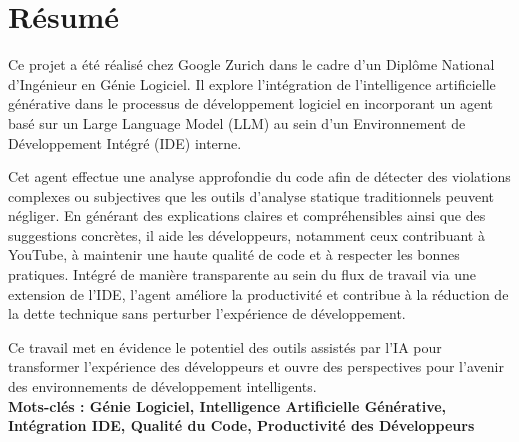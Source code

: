 \chapter*{Résumé}

Ce projet a été réalisé chez Google Zurich dans le cadre d’un Diplôme National d’Ingénieur en Génie Logiciel. Il explore l’intégration de l’intelligence artificielle générative dans le processus de développement logiciel en incorporant un agent basé sur un Large Language Model (LLM) au sein d’un Environnement de Développement Intégré (IDE) interne.

Cet agent effectue une analyse approfondie du code afin de détecter des violations complexes ou subjectives que les outils d’analyse statique traditionnels peuvent négliger. En générant des explications claires et compréhensibles ainsi que des suggestions concrètes, il aide les développeurs, notamment ceux contribuant à YouTube, à maintenir une haute qualité de code et à respecter les bonnes pratiques. Intégré de manière transparente au sein du flux de travail via une extension de l’IDE, l’agent améliore la productivité et contribue à la réduction de la dette technique sans perturber l’expérience de développement.

Ce travail met en évidence le potentiel des outils assistés par l’IA pour transformer l’expérience des développeurs et ouvre des perspectives pour l’avenir des environnements de développement intelligents.\\

\textbf{Mots-clés : Génie Logiciel, Intelligence Artificielle Générative, Intégration IDE, Qualité du Code, Productivité des Développeurs}